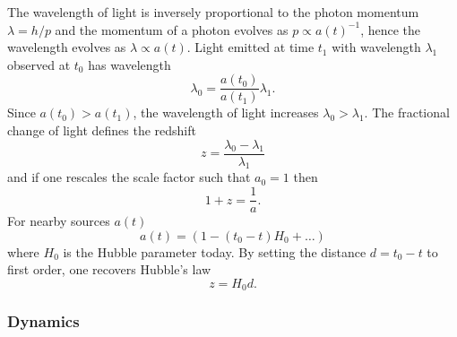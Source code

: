 The wavelength of light is inversely proportional to the photon momentum \(\lambda = h/p\) and the momentum of a photon evolves as \(p \propto {a(t)}^{-1}\), hence the wavelength evolves as \(\lambda \propto a(t)\).
Light emitted at time \(t_{1}\) with wavelength \(\lambda_{1}\) observed at \(t_{0}\) has wavelength
%
\begin{equation}
	\lambda_{0}
	= \frac{a(t_{0})}{a(t_{1})} \lambda_{1}.
\end{equation}
%
Since \(a(t_{0}) > a(t_{1})\), the wavelength of light increases \(\lambda_{0} > \lambda_{1}\).
The fractional change of light defines the redshift
%
\begin{equation}
	z
	= \frac{\lambda_{0} - \lambda_{1}}{\lambda_{1}}
\end{equation}
%
and if one rescales the scale factor such that \(a_{0}=1\) then
%
\begin{equation}
	1 + z
	= \frac{1}{a}.
\end{equation}
%
For nearby sources \(a(t)\)
%
\begin{equation}
	a(t)
	= (1 - (t_{0} - t)H_{0} + \ldots)
\end{equation}
%
where \(H_{0}\) is the Hubble parameter today.
By setting the distance \(d = t_{0} - t\) to first order, one recovers Hubble's law
%
\begin{equation}
	z
	= H_{0}d.
\end{equation}

\subsubsection{Dynamics}

